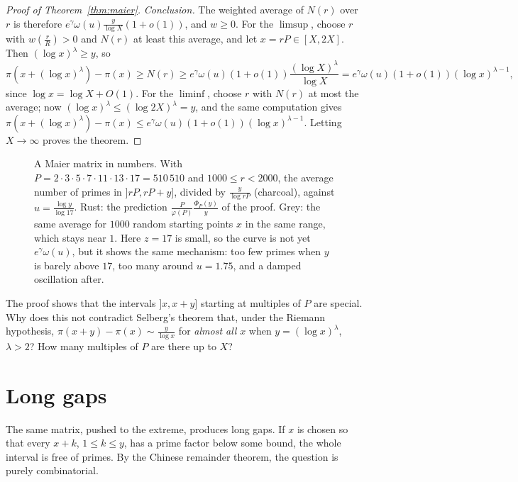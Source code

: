 \begin{proof}[Proof of Theorem~\ref{thm:maier}]
\emph{Conclusion.} The weighted average of $N(r)$ over $r$ is therefore $e^\gamma\omega(u)\frac y{\log X}(1+o(1))$, and $w\ge0$. For the $\limsup$, choose $r$ with $w(\frac rR)>0$ and $N(r)$ at least this average, and let $x=rP\in[X,2X]$. Then $(\log x)^\lambda\ge y$, so
\[
\pi(x+(\log x)^\lambda)-\pi(x)\ge N(r)\ge e^\gamma\omega(u)(1+o(1))\frac{(\log X)^\lambda}{\log X}=e^\gamma\omega(u)(1+o(1))(\log x)^{\lambda-1},
\]
since $\log x=\log X+O(1)$. For the $\liminf$, choose $r$ with $N(r)$ at most the average; now $(\log x)^\lambda\le(\log2X)^\lambda=y$, and the same computation gives $\pi(x+(\log x)^\lambda)-\pi(x)\le e^\gamma\omega(u)(1+o(1))(\log x)^{\lambda-1}$. Letting $X\to\infty$ proves the theorem.
\end{proof}

\begin{figure}[ht]
\centering{}
\caption{A Maier matrix in numbers. With $P=2\cdot3\cdot5\cdot7\cdot11\cdot13\cdot17=510\,510$ and $1000\le r<2000$, the average number of primes in $]rP,rP+y]$, divided by $\frac y{\log rP}$ (charcoal), against $u=\frac{\log y}{\log17}$. Rust: the prediction $\frac{P}{\varphi(P)}\frac{\Phi_P(y)}y$ of the proof. Grey: the same average for $1000$ random starting points $x$ in the same range, which stays near $1$. Here $z=17$ is small, so the curve is not yet $e^\gamma\omega(u)$, but it shows the same mechanism: too few primes when $y$ is barely above $17$, too many around $u=1.75$, and a damped oscillation after.}
\label{fig:maier}
\end{figure}

\begin{think}
The proof shows that the intervals $]x,x+y]$ starting at multiples of $P$ are special. Why does this not contradict Selberg's theorem that, under the Riemann hypothesis, $\pi(x+y)-\pi(x)\sim\frac y{\log x}$ for \emph{almost all} $x$ when $y=(\log x)^\lambda$, $\lambda>2$? How many multiples of $P$ are there up to $X$?
\end{think}

\section{Long gaps}

The same matrix, pushed to the extreme, produces long gaps. If $x$ is chosen so that every $x+k$, $1\le k\le y$, has a prime factor below some bound, the whole interval is free of primes. By the Chinese remainder theorem, the question is purely combinatorial.

